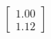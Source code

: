\documentclass[preview]{standalone}
\begin{document}
\begin{align*}
\begin{bmatrix} 1.00 \\ 1.12 \end{bmatrix}
\end{align*}
\end{document}
